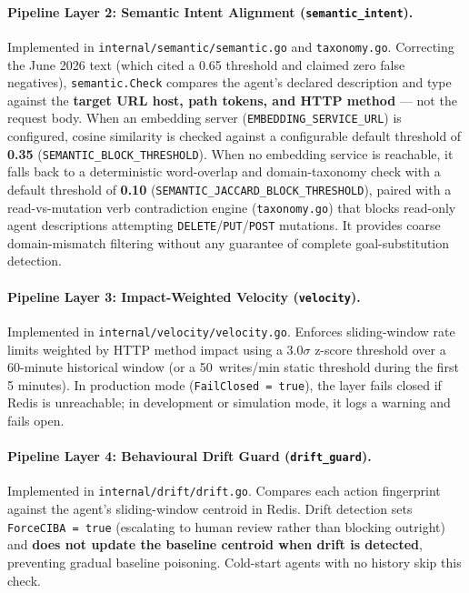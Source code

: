 \documentclass[11pt, a4paper]{article}
\begin{document}
\paragraph{Pipeline Layer 2: Semantic Intent Alignment (\texttt{semantic\_intent}).}
Implemented in \texttt{internal/semantic/semantic.go} and \texttt{taxonomy.go}. Correcting the June 2026 text (which cited a 0.65 threshold and claimed zero false negatives), \texttt{semantic.Check} compares the agent's declared description and type against the \textbf{target URL host, path tokens, and HTTP method} --- not the request body. When an embedding server (\texttt{EMBEDDING\_SERVICE\_URL}) is configured, cosine similarity is checked against a configurable default threshold of \textbf{0.35} (\texttt{SEMANTIC\_BLOCK\_THRESHOLD}). When no embedding service is reachable, it falls back to a deterministic word-overlap and domain-taxonomy check with a default threshold of \textbf{0.10} (\texttt{SEMANTIC\_JACCARD\_BLOCK\_THRESHOLD}), paired with a read-vs-mutation verb contradiction engine (\texttt{taxonomy.go}) that blocks read-only agent descriptions attempting \texttt{DELETE}/\texttt{PUT}/\texttt{POST} mutations. It provides coarse domain-mismatch filtering without any guarantee of complete goal-substitution detection.

\paragraph{Pipeline Layer 3: Impact-Weighted Velocity (\texttt{velocity}).}
Implemented in \texttt{internal/velocity/velocity.go}. Enforces sliding-window rate limits weighted by HTTP method impact using a $3.0\sigma$ z-score threshold over a 60-minute historical window (or a 50~writes/min static threshold during the first 5 minutes). In production mode (\texttt{FailClosed = true}), the layer fails closed if Redis is unreachable; in development or simulation mode, it logs a warning and fails open.

\paragraph{Pipeline Layer 4: Behavioural Drift Guard (\texttt{drift\_guard}).}
Implemented in \texttt{internal/drift/drift.go}. Compares each action fingerprint against the agent's sliding-window centroid in Redis. Drift detection sets \texttt{ForceCIBA = true} (escalating to human review rather than blocking outright) and \textbf{does not update the baseline centroid when drift is detected}, preventing gradual baseline poisoning. Cold-start agents with no history skip this check.
\end{document}
